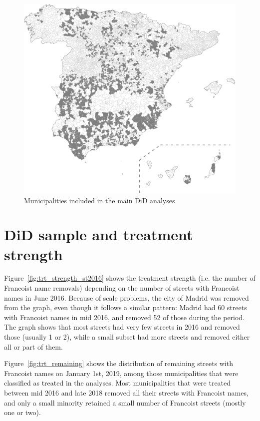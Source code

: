 \documentclass[12pt, titlepage]{article}
\begin{document}
\begin{figure}[htb!]
\centering

  \includegraphics[width = \textwidth]{img/map}

  \caption{Municipalities included in the main DiD analyses}\label{fig:map}

\end{figure}


\clearpage
\section{DiD sample and treatment strength}\label{app:treatment_strength}

Figure~\ref{fig:trt_strength_st2016} shows the treatment strength (i.e. the number of Francoist name removals) depending on the number of streets with Francoist names in June 2016. Because of scale problems, the city of Madrid was removed from the graph, even though it follows a similar pattern: Madrid had 60 streets with Francoist names in mid 2016, and removed 52 of those during the period.
The graph shows that most streets had very few streets in 2016 and removed those (usually 1 or 2), while a small subset had more streets and removed either all or part of them.

Figure~\ref{fig:trt_remaining} shows the distribution of remaining streets with Francoist names on January 1st, 2019, among those municipalities that were classified as treated in the analyses.
Most municipalities that were treated between mid 2016 and late 2018 removed all their streets with Francoist names, and only a small minority retained a small number of Francoist streets (mostly one or two).
\end{document}
